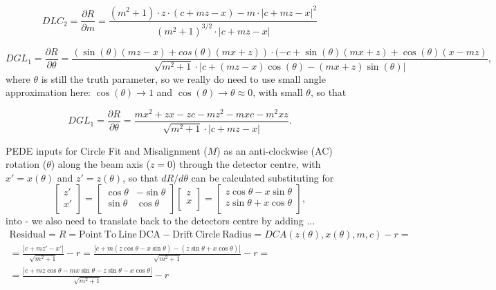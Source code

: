 \documentclass[a4paper,11pt]{article}
\begin{document}
\begin{equation}
DLC_2 = \frac{ \partial R}{\partial m} = \frac{ (m^2+1)\cdot z\cdot(c+mz-x) - m\cdot |c+mz-x|^2 }{ (m^2+1)^{3/2} \cdot |c+mz-x|  }
\end{equation}

\begin{equation}	
DGL_1 = \frac{\partial R}{\partial\theta} = \frac{(\sin(\theta)(mz-x)+cos(\theta)(mx+z)) \cdot (-c+\sin(\theta)(mx+z)+\cos(\theta)(x-mz)}{\sqrt{m^2+1} \cdot |c+(mz-x)\cos(\theta) - (mx+z)\sin(\theta)|},
\end{equation}
where $\theta$ is still the truth parameter, so we really do need to use small angle approximation here: $\cos(\theta) \rightarrow 1$ and $\cos(\theta) \rightarrow \theta \approx 0$, with small $\theta$, so that 

\begin{equation}	
DGL_1 = \frac{\partial R}{\partial\theta} = \frac{mx^2+zx-zc-mz^2-mxc-m^2xz}{\sqrt{m^2+1} \cdot |c+mz-x|}.
\end{equation}





\clearpage 

PEDE inputs for Circle Fit and Misalignment ($M$) as an anti-clockwise (AC) rotation ($\theta$) along the beam axis ($z=0$) through the detector centre, with $x'=x(\theta)$ and $z'=z(\theta)$, so that $dR/d\theta$ can be calculated substituting for  
\begin{equation}
\begin{bmatrix}z'\\x'\\\end{bmatrix}=\begin{bmatrix}\cos \theta &-\sin \theta \\\sin \theta &\cos \theta \\\end{bmatrix} \begin{bmatrix}z\\x\\\end{bmatrix} = \begin{bmatrix}z\cos \theta -x\sin \theta \\z\sin \theta +x\cos \theta \\\end{bmatrix},
\end{equation}
into - we also need to translate back to the detectors centre by adding ...
\begin{equation}
\begin{split}
\mathrm{Residual}= R =\mathrm{Point \ To \ Line \ DCA} - \mathrm{Drift \ Circle \ Radius} = DCA(z(\theta),x(\theta),m,c) - r = \\
= \frac{ |c+mz'-x'| }  { \sqrt{m^2+1} } -r = \frac{ |c+m(z\cos \theta -x\sin \theta)-(z\sin \theta +x\cos \theta)| }  { \sqrt{m^2+1} } -r=\\ = \frac{ |c+mz\cos \theta -mx\sin \theta-z\sin \theta -x\cos \theta| }  { \sqrt{m^2+1} } -r
\end{split}
\end{equation}
\end{document}
